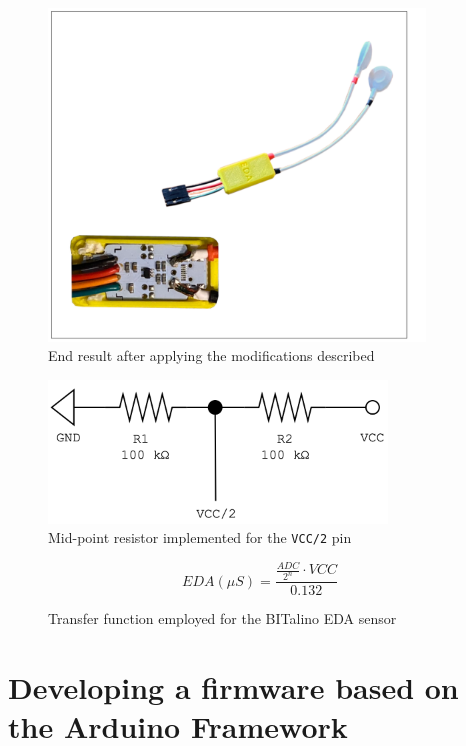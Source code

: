 \begin{figure}
    \centering
    \includegraphics[width=10cm]{./images/full-sensor-view.drawio.png}
    \caption{End result after applying the modifications described}
    \label{fig:full-sensor-configuration}
\end{figure}

\begin{figure}
    \centering
    \includegraphics[width=9cm]{./images/midpoint-resistor.drawio.png}
    \caption{Mid-point resistor implemented for the \texttt{VCC/2} pin}
    \label{fig:voltage-divider-schema}
\end{figure}

\begin{figure}
    \begingroup
    \Large
    \begin{equation}
    EDA(\mu S) = \frac{\frac{ADC}{2^n} \cdot VCC}{0.132}
    \end{equation}
    \caption{Transfer function employed for the BITalino EDA sensor}
    \label{fig:bitalino-transfer-function}
    \endgroup
\end{figure}

\pagebreak

\section{Developing a firmware based on the Arduino Framework}\label{sec:firmware}

